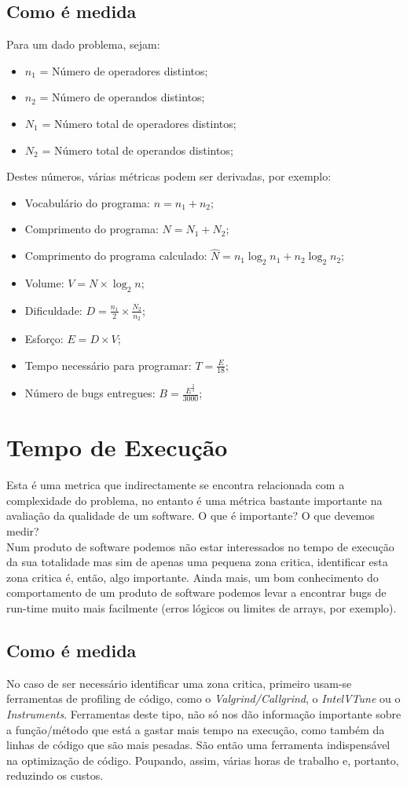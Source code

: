 \documentclass[a4paper,10pt,openright,openbib,twocolumn]{article}
\begin{document}
\subsection{Como é medida}
Para um dado problema, sejam:
\begin{itemize}
	\item $n_1$ = Número de operadores distintos;
	\item $n_2$ = Número de operandos distintos;
	\item $N_1$ = Número total de operadores distintos;
	\item $N_2$ = Número total de operandos distintos;
\end{itemize}
Destes números, várias métricas podem ser derivadas, por exemplo:
\begin{itemize}
	\item Vocabulário do programa: $n = n_1 + n_2$;
	\item Comprimento do programa: $N = N_1 + N_2$;
	\item Comprimento do programa calculado: $\widehat{N} = n_1 \log_2{n_1} + n_2 \log_2{n_2}$;
	\item Volume: $V = N \times \log_2{n}$;
	\item Dificuldade: $D = \frac{n_1}{2} \times \frac{N_2}{n_2}$;
	\item Esforço: $E = D \times V$;
	\item Tempo necessário para programar: $T = \frac{E}{18}$;
	\item Número de bugs entregues: $B = \frac{E^{\frac{2}{3}}}{3000}$;
\end{itemize}

\section{Tempo de Execução}
Esta é uma metrica que indirectamente se encontra relacionada com a complexidade do problema, no entanto é uma métrica bastante importante na avaliação da qualidade de um software. O que é importante? O que devemos medir? \\
Num produto de software podemos não estar interessados no tempo de execução da sua totalidade mas sim de apenas uma pequena zona critica, identificar esta zona critica é, então, algo importante. Ainda mais, um bom conhecimento do comportamento de um produto de software podemos levar a encontrar bugs de run-time muito mais facilmente (erros lógicos ou limites de arrays, por exemplo). 

\subsection{Como é medida}
No caso de ser necessário identificar uma zona critica, primeiro usam-se ferramentas de profiling de código, como o \emph{Valgrind/Callgrind}, o \emph{Intel\textregistered VTune} ou o \emph{Instruments}. Ferramentas deste tipo, não só nos dão informação importante sobre a função/método que está a gastar mais tempo na execução, como também da linhas de código que são mais pesadas. São então uma ferramenta indispensável na optimização de código. Poupando, assim, várias horas de trabalho e, portanto, reduzindo os custos. 
\end{document}
